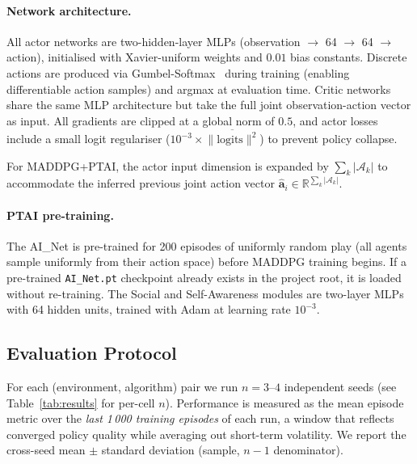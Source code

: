 \documentclass[12pt]{article}
\begin{document}
\paragraph{Network architecture.}
All actor networks are two-hidden-layer MLPs (observation $\to$ 64 $\to$ 64 $\to$ action),
initialised with Xavier-uniform weights and $0.01$ bias constants.
Discrete actions are produced via Gumbel-Softmax~\cite{jang2017categorical} during training
(enabling differentiable action samples) and argmax at evaluation time.
Critic networks share the same MLP architecture but take the full joint observation-action
vector as input.
All gradients are clipped at a global norm of $0.5$, and actor losses include a small
logit regulariser ($10^{-3} \times \overline{\|\text{logits}\|^2}$) to prevent
policy collapse.

For MADDPG+PTAI, the actor input dimension is expanded by
$\sum_k |\mathcal{A}_k|$ to accommodate the inferred previous joint action vector
$\widehat{\mathbf{a}}_i \in \mathbb{R}^{\sum_k |\mathcal{A}_k|}$.

\paragraph{PTAI pre-training.}
The AI\_Net is pre-trained for 200 episodes of uniformly random play (all agents sample
uniformly from their action space) before MADDPG training begins. If a pre-trained
\texttt{AI\_Net.pt} checkpoint already exists in the project root, it is loaded without
re-training. The Social and Self-Awareness modules are two-layer MLPs with 64 hidden
units, trained with Adam at learning rate $10^{-3}$.

\subsection{Evaluation Protocol}

For each (environment, algorithm) pair we run $n = 3$--$4$ independent seeds (see
Table~\ref{tab:results} for per-cell $n$). Performance is measured as the mean episode
metric over the \emph{last 1\,000 training episodes} of each run, a window that reflects
converged policy quality while averaging out short-term volatility. We report the
cross-seed mean $\pm$ standard deviation (sample, $n-1$ denominator).
\end{document}

